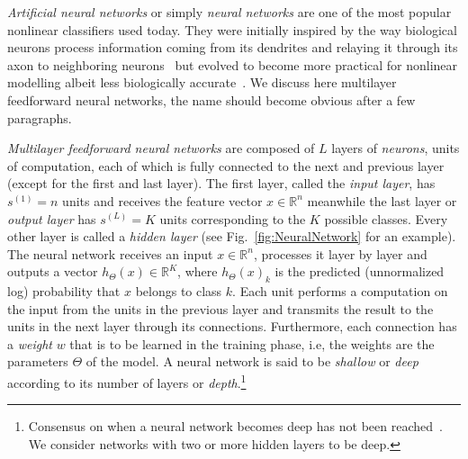 \emph{Artificial neural networks} or simply \emph{neural networks} are one of the most popular nonlinear classifiers used today. They were initially inspired by the way biological neurons process information coming from its dendrites and relaying it through its axon to neighboring neurons~\cite{McCulloch1943, Widrow1960, Rosenblatt1962} but evolved to become more practical for nonlinear modelling albeit less biologically accurate~\cite{Rumelhart1986}. We discuss here multilayer feedforward neural networks, the name should become obvious after a few paragraphs.

\emph{Multilayer feedforward neural networks} are composed of $L$ layers of \emph{neurons}, units of computation, each of which is fully connected to the next and previous layer (except for the first and last layer). The first layer, called the \emph{input layer}, has $s^{(1)} = n$ units and receives the feature vector $x \in \mathbb{R}^n$ meanwhile the last layer or \emph{output layer} has $s^{(L)} = K$ units corresponding to the $K$ possible classes. Every other layer is called a \emph{hidden layer} (see Fig.~\ref{fig:NeuralNetwork} for an example). The neural network receives an input $x \in \mathbb{R}^n$, processes it layer by layer and outputs a vector $h_\Theta(x) \in \mathbb{R}^K$, where $h_\Theta(x)_k$ is the predicted (unnormalized log) probability that $x$ belongs to class $k$. Each unit performs a computation on the input from the units in the previous layer and transmits the result to the units in the next layer through its connections. Furthermore, each connection has a \emph{weight} $w$ that is to be learned in the training phase, i.e, the weights are the parameters $\Theta$ of the model. A neural network is said to be \emph{shallow} or \emph{deep} according to its number of layers or \emph{depth}.\footnote{Consensus on when a neural network becomes deep has not been reached~\cite{Schmidhuber2015}. We consider networks with two or more hidden layers to be deep.}

